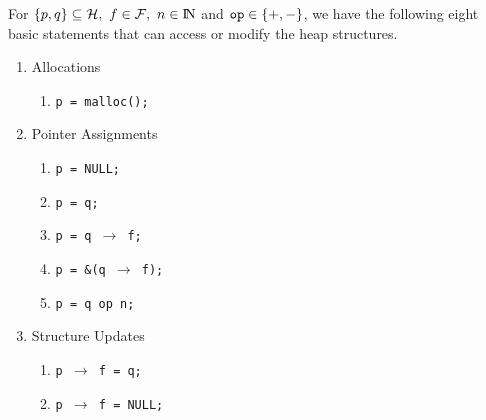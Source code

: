 \documentclass[runningheads,a4paper]{llncs}
\newcommand{\p}{\ensuremath{p}}
\newcommand{\q}{\ensuremath{q}}
\newcommand{\heap}{\ensuremath{\mathcal{H}}}
\newcommand{\fields}{\ensuremath{\mathcal{F}}}
\newcommand{\nat}{\ensuremath{\bbbn}}
\begin{document}
For $\{\p, \q\} \subseteq \heap,\ f \in\fields,\ n \in \nat$
and $\mbox{\tt op} \in \{+, -\}$, 
we have the following eight basic statements that can access or modify the heap structures. 
\begin{enumerate}
  \item Allocations
  	\begin{enumerate}
    	\item {\tt p = malloc();}
  	\end{enumerate}
  \item Pointer Assignments
  	\begin{enumerate}
    	\item {\tt p = NULL;}
    	\item {\tt p = q;}
    	\item {\tt p = q $\rightarrow$ f;}
    	\item {\tt p = \&(q $\rightarrow$ f);}
    	\item {\tt p = q op n;}
  	\end{enumerate}
  \item Structure Updates
  	\begin{enumerate}
    	\item {\tt p $\rightarrow$ f = q;}
    	\item {\tt p $\rightarrow$ f = NULL;}
  	\end{enumerate}
\end{enumerate}
\end{document}
